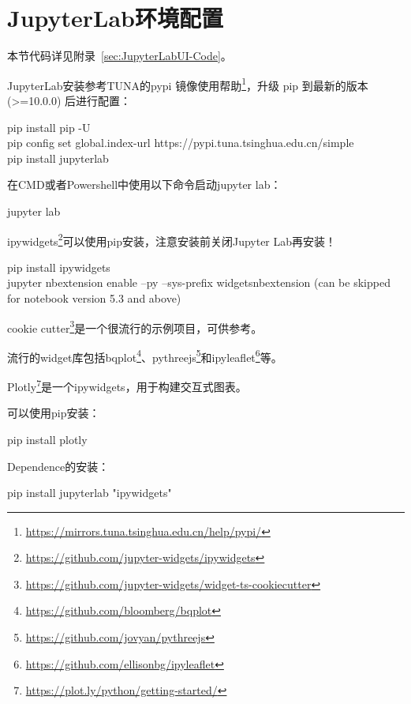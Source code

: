 \section{JupyterLab环境配置}

本节代码详见附录~\ref{sec:JupyterLabUI-Code}。

JupyterLab安装参考TUNA的pypi 镜像使用帮助\footnote{\url{https://mirrors.tuna.tsinghua.edu.cn/help/pypi/}}，升级 pip 到最新的版本 (>=10.0.0) 后进行配置：

\begin{tcolorbox}
    pip install pip -U \\
    pip config set global.index-url https://pypi.tuna.tsinghua.edu.cn/simple \\
    pip install jupyterlab
\end{tcolorbox}

在CMD或者Powershell中使用以下命令启动jupyter lab：

\begin{tcolorbox}
    jupyter lab
\end{tcolorbox}

ipywidgets\footnote{\url{https://github.com/jupyter-widgets/ipywidgets}}可以使用pip安装，注意安装前关闭Jupyter Lab再安装！

\begin{tcolorbox}
    pip install ipywidgets \\
    jupyter nbextension enable --py --sys-prefix widgetsnbextension  (can be skipped for notebook version 5.3 and above)
\end{tcolorbox}

cookie cutter\footnote{\url{https://github.com/jupyter-widgets/widget-ts-cookiecutter}}是一个很流行的示例项目，可供参考。

流行的widget库包括bqplot\footnote{\url{https://github.com/bloomberg/bqplot}}、pythreejs\footnote{\url{https://github.com/jovyan/pythreejs}}和ipyleaflet\footnote{\url{https://github.com/ellisonbg/ipyleaflet}}等。

Plotly\footnote{\url{https://plot.ly/python/getting-started/}}是一个ipywidgets，用于构建交互式图表。

可以使用pip安装：

\begin{tcolorbox}
    pip install plotly
\end{tcolorbox}

Dependence的安装：

\begin{tcolorbox}
    pip install jupyterlab "ipywidgets"
\end{tcolorbox}

